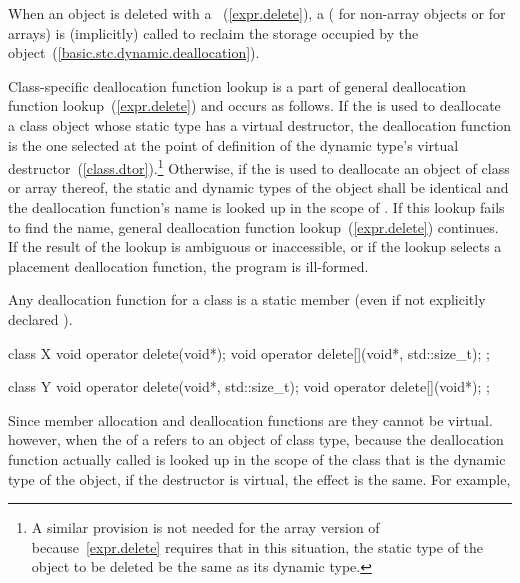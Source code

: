 \pnum
{}%
When an object is deleted with a
~(\ref{expr.delete}),
a 
%
(
%
for non-array objects or
%
for arrays) is (implicitly) called to reclaim the storage occupied by
the object~(\ref{basic.stc.dynamic.deallocation}).

\pnum
Class-specific deallocation function lookup is a part of general deallocation
function lookup~(\ref{expr.delete}) and occurs as follows.
If the 
is used to deallocate a class object whose static type has a virtual
destructor, the deallocation function is the one selected at the point
of definition of the dynamic type's virtual
destructor~(\ref{class.dtor}).\footnote{A similar provision is not needed for
the array version of   because~\ref{expr.delete}
requires that in this situation, the static type of the object to be deleted be
the same as its dynamic type.
}
Otherwise, if the
is used to deallocate an object of class
or array thereof, the static and dynamic types of the object shall be
identical and the deallocation function's name is looked up in the scope of
.
If this lookup fails to find the name, general deallocation function
lookup~(\ref{expr.delete}) continues.
If the result of the lookup is ambiguous or inaccessible, or if the lookup
selects a placement deallocation function, the program is ill-formed.

\pnum
{}%
Any deallocation function for a class
is a static member (even if not explicitly declared
).
%
\enterexample

\begin{codeblock}
class X {
  void operator delete(void*);
  void operator delete[](void*, std::size_t);
};

class Y {
  void operator delete(void*, std::size_t);
  void operator delete[](void*);
};
\end{codeblock}
\exitexample

\pnum
Since member allocation and deallocation functions are
they cannot be virtual.
\enternote
{}%
%
however, when the
of a
refers to an object of class type,
because the deallocation function actually called is looked up in the scope of
the class that is the dynamic type of the object,
if the destructor is virtual, the effect is the same.
For example,

